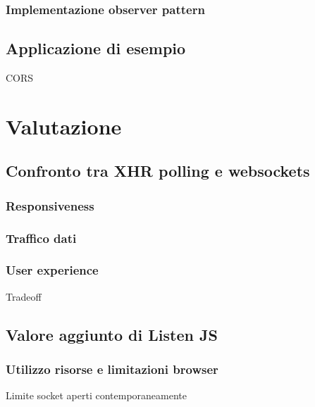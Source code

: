 \documentclass[12pt,a4paper,openright,twoside]{report}
\begin{document}
\subsection{Implementazione observer pattern}

\section{Applicazione di esempio}\label{sec_applicazioneesempio}
CORS
\chapter{Valutazione}

\section{Confronto tra XHR polling e websockets}\label{sec_confrontopollingwebsockets}

\subsection{Responsiveness}

\subsection{Traffico dati}

\subsection{User experience}
Tradeoff

\section{Valore aggiunto di Listen JS}\label{sec_valorelistenjs}

\subsection{Utilizzo risorse e limitazioni browser}
Limite socket aperti contemporaneamente
\end{document}
